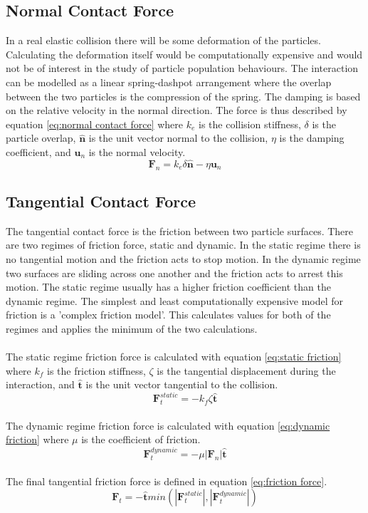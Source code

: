 \documentclass[10pt,a4paper,titlepage]{report}
\begin{document}
\subsection{Normal Contact Force}
In a real elastic collision there will be some deformation of the particles. Calculating the deformation itself would be computationally expensive and would not be of interest in the study of particle population behaviours. The interaction can be modelled as a linear spring-dashpot arrangement where the overlap between the two particles is the compression of the spring. The damping is based on the relative velocity in the normal direction. The force is thus described by equation \ref{eq:normal contact force} where $k_{e}$ is the collision stiffness, $\delta$ is the particle overlap, $\mathbf{\hat{n}}$ is the unit vector normal to the collision, $\eta$ is the damping coefficient, and $\mathbf{u}_{n}$ is the normal velocity.%
\begin{equation}
\mathbf{F}_{n} = k_{e} \delta \mathbf{\hat{n}} - \eta \mathbf{u}_{n}
\label{eq:normal contact force}
\end{equation}
\subsection{Tangential Contact Force}
The tangential contact force is the friction between two particle surfaces. There are two regimes of friction force, static and dynamic. In the static regime there is no tangential motion and the friction acts to stop motion. In the dynamic regime two surfaces are sliding across one another and the friction acts to arrest this motion. The static regime usually has a higher friction coefficient than the dynamic regime. The simplest and least computationally expensive model for friction is a 'complex friction model'. This calculates values for both of the regimes and applies the minimum of the two calculations.\cite{tuley}
\\\\The static regime friction force is calculated with equation \ref{eq:static friction} where $k_f$ is the friction stiffness, $\zeta$ is the tangential displacement during the interaction, and $\mathbf{\hat{t}}$ is the unit vector tangential to the collision. 
\begin{equation}
\mathbf{F}_{t}^{static} = - k_{f} \zeta \mathbf{\hat{t}}
\label{eq:static friction}
\end{equation}
\\The dynamic regime friction force is calculated with equation \ref{eq:dynamic friction} where $\mu$ is the coefficient of friction.
\begin{equation}
\mathbf{F}_{t}^{dynamic} = - \mu |\mathbf{F}_{n}| \mathbf{\hat{t}}
\label{eq:dynamic friction}
\end{equation}
\\The final tangential friction force is defined in equation \ref{eq:friction force}.
\begin{equation}
\mathbf{F}_{t} = -\mathbf{\hat{t}}min(|\mathbf{F}_{t}^{static}|, |\mathbf{F}_{t}^{dynamic}|)
\label{eq:friction force}
\end{equation}
\end{document}
